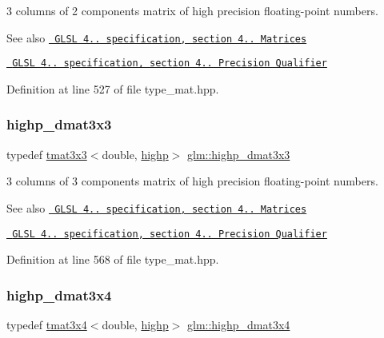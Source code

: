 3 columns of 2 components matrix of high precision floating-\/point numbers.

\begin{DoxySeeAlso}{See also}
\href{http://www.opengl.org/registry/doc/GLSLangSpec.4.20.8.pdf}{\texttt{ G\+L\+SL 4.. specification, section 4.. Matrices}} 

\href{http://www.opengl.org/registry/doc/GLSLangSpec.4.20.8.pdf}{\texttt{ G\+L\+SL 4.. specification, section 4.. Precision Qualifier}} 
\end{DoxySeeAlso}


Definition at line 527 of file type\+\_\+mat.\+hpp.

\mbox{\label{group__core__precision_ga604f966e7bf042f298beb3b262287970}} 
\subsubsection{\texorpdfstring{highp\_dmat3x3}{highp\_dmat3x3}}
{\footnotesize\ttfamily typedef \mbox{\hyperlink{structglm_1_1tmat3x3}{tmat3x3}}$<$double, \mbox{\hyperlink{namespaceglm_a0f04f086094c747d227af4425893f545ac6f7eab42eacbb10d59a58e95e362074}{highp}}$>$ \mbox{\hyperlink{group__core__precision_ga604f966e7bf042f298beb3b262287970}{glm\+::highp\+\_\+dmat3x3}}}

3 columns of 3 components matrix of high precision floating-\/point numbers.

\begin{DoxySeeAlso}{See also}
\href{http://www.opengl.org/registry/doc/GLSLangSpec.4.20.8.pdf}{\texttt{ G\+L\+SL 4.. specification, section 4.. Matrices}} 

\href{http://www.opengl.org/registry/doc/GLSLangSpec.4.20.8.pdf}{\texttt{ G\+L\+SL 4.. specification, section 4.. Precision Qualifier}} 
\end{DoxySeeAlso}


Definition at line 568 of file type\+\_\+mat.\+hpp.

\mbox{\label{group__core__precision_ga2f3cf8e3bd4ea0beeefe56b45b14118b}} 
\subsubsection{\texorpdfstring{highp\_dmat3x4}{highp\_dmat3x4}}
{\footnotesize\ttfamily typedef \mbox{\hyperlink{structglm_1_1tmat3x4}{tmat3x4}}$<$double, \mbox{\hyperlink{namespaceglm_a0f04f086094c747d227af4425893f545ac6f7eab42eacbb10d59a58e95e362074}{highp}}$>$ \mbox{\hyperlink{group__core__precision_ga2f3cf8e3bd4ea0beeefe56b45b14118b}{glm\+::highp\+\_\+dmat3x4}}}

